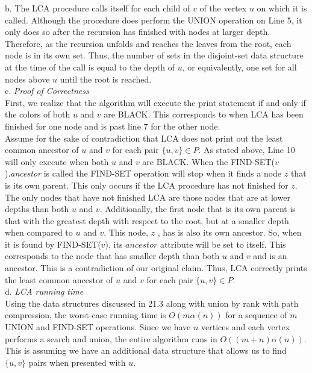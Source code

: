 \documentclass[]{report}
\begin{document}
\begin{enumerate}
	 b. The LCA procedure calls itself for each child of $ v $ of the vertex $ u $ on which it is called. Although the procedure does perform the UNION operation on Line 5, it only does so after the recursion has finished with nodes at larger depth. Therefore, as the recursion unfolds and reaches the leaves from the root, each node is in its own set. Thus, the number of sets in the disjoint-set data structure at the time of the call is equal to the depth of $ u $, or equivalently, one set for all nodes above $ u $ until the root is reached. \\
	  	 
	 c.  \textit{Proof of Correctness} \\
	 
	 First, we realize that the algorithm will execute the print statement if and only if the colors of both $ u $ and $ v $ are BLACK. This corresponds to when LCA has been finished for one node and is past line 7 for the other node. \\
	 
	 Assume for the sake of contradiction that LCA does not print out the least common ancestor of $ u $ and $ v $ for each pair $\{u,v\} \in P $. As stated above, Line 10 will only execute when both $ u $ and $ v $ are BLACK. When the FIND-SET($v$).\textit{ancestor} is called the FIND-SET operation will stop when it finds a node $z$ that is its own parent. This only occurs if the LCA procedure has not finished for $ z $. The only nodes that have not finished LCA are those nodes that are at lower depths than both $ u $ and $ v $. Additionally, the first node that is its own parent is that with the greatest depth with respect to the root, but at a smaller depth when compared to $ u $ and $ v $. This node, $ z $ , has is also its own ancestor. So, when it is found by FIND-SET($v$), its $ ancestor $ attribute will be set to itself. This corresponds to the node that has smaller depth than both $ u $ and $ v $ and is an ancestor. This is a contradiction of our original claim. Thus, LCA correctly prints the least common ancestor of $ u $ and $ v $ for each pair $\{u,v\} \in P $. \\
	 	 
	 d. \textit{LCA running time} \\
	 
	 Using the data structures discussed in 21.3 along with union by rank with path compression, the worst-case running time is $ O(m \alpha (n)) $ for a sequence of $m$ UNION and FIND-SET operations. Since we have $ n $ vertices and each vertex performs a search and union, the entire algorithm runs in $ O((m+n) \alpha (n)) $. This is assuming we have an additional data structure that allows us to find $\{u,v\} $ pairs when presented with $ u $.  \\
	 

\end{enumerate}
\end{document}
